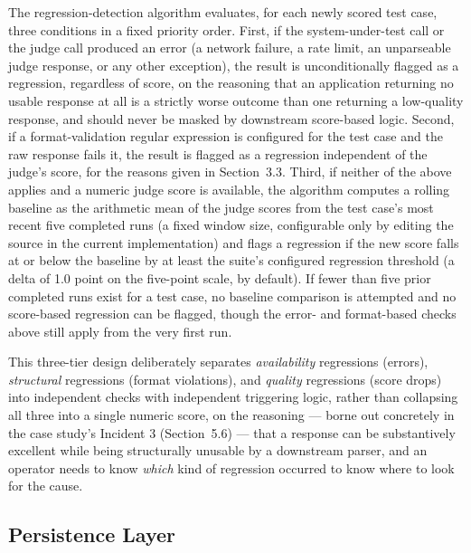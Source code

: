 \documentclass[11pt,a4paper]{article}
\begin{document}
The regression-detection algorithm evaluates, for each newly scored test
case, three conditions in a fixed priority order. First, if the
system-under-test call or the judge call produced an error (a network
failure, a rate limit, an unparseable judge response, or any other
exception), the result is unconditionally flagged as a regression,
regardless of score, on the reasoning that an application returning no
usable response at all is a strictly worse outcome than one returning a
low-quality response, and should never be masked by downstream
score-based logic. Second, if a format-validation regular expression is
configured for the test case and the raw response fails it, the result
is flagged as a regression independent of the judge's
score, for the reasons given in Section~3.3. Third, if neither of the
above applies and a numeric judge score is available, the algorithm
computes a rolling baseline as the arithmetic mean of the judge scores
from the test case's most recent five completed runs (a
fixed window size, configurable only by editing the source in the
current implementation) and flags a regression if the new score falls at
or below the baseline by at least the suite's configured
regression threshold (a delta of 1.0 point on the five-point scale, by
default). If fewer than five prior completed runs exist for a test case,
no baseline comparison is attempted and no score-based regression can be
flagged, though the error- and format-based checks above still apply
from the very first run.

This three-tier design deliberately separates \emph{availability}
regressions (errors), \emph{structural} regressions (format violations),
and \emph{quality} regressions (score drops) into independent checks
with independent triggering logic, rather than collapsing all three into
a single numeric score, on the reasoning --- borne out concretely in
the case study's Incident 3 (Section~5.6) --- that a
response can be substantively excellent while being structurally
unusable by a downstream parser, and an operator needs to know
\emph{which} kind of regression occurred to know where to look for the
cause.

\subsection{Persistence Layer}
\end{document}
